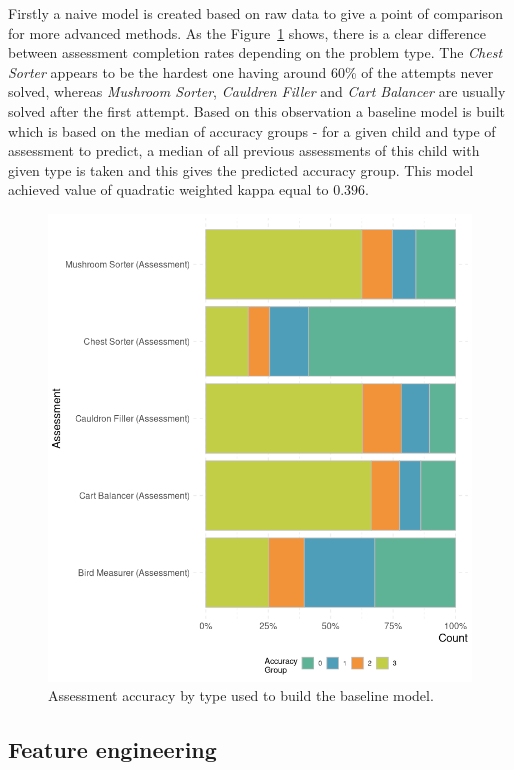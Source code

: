\documentclass[fleqn,10pt]{SelfArx} %
\begin{document}
Firstly a naive model is created based on raw data to give a point of comparison for more advanced methods.
As the Figure~\ref{fig:assessment-accuracy-by-type} shows, there is a clear difference between assessment completion rates depending on the problem type.
The \textit{Chest Sorter} appears to be the hardest one having around 60\% of the attempts never solved, whereas \textit{Mushroom Sorter}, \textit{Cauldren Filler} and \textit{Cart Balancer} are usually solved after the first attempt.
Based on this observation a baseline model is built which is based on the median of accuracy groups - for a given child and type of assessment to predict, a median of all previous assessments of this child with given type is taken and this gives the predicted accuracy group.
This model achieved value of quadratic weighted kappa equal to $0.396$.

\begin{figure}[ht]
    \centering
    \includegraphics[width=\linewidth]{images/assessment-accuracy-by-type.png}
    \caption{Assessment accuracy by type used to build the baseline model.}
    \label{fig:assessment-accuracy-by-type}
\end{figure}

\subsection{Feature engineering}
\end{document}
